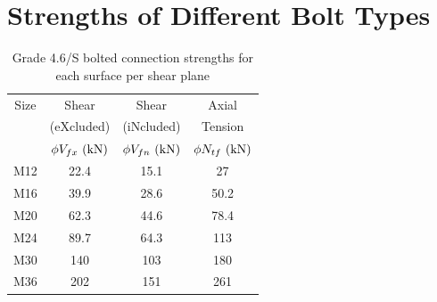 \section{Strengths of Different Bolt Types}
\begin{table}[H]
\centering\footnotesize
\caption{Grade 4.6/S bolted connection strengths for each surface per shear plane}
\begin{tabular}{c|ccc}
	\toprule
	Size &           Shear           &           Shear           &          Axial           \\
	     &        (eXcluded)         &        (iNcluded)         &         Tension          \\
	     & $\phi{}V_{fx}~(\si{\kilo\newton})$ & $\phi{}V_{fn}~(\si{\kilo\newton})$ & $\phi{}N_{tf}~(\si{\kilo\newton})$ \\ \midrule
	M12  &           22.4            &           15.1            &            27            \\
	M16  &           39.9            &           28.6            &           50.2           \\
	M20  &           62.3            &           44.6            &           78.4           \\
	M24  &           89.7            &           64.3            &           113            \\
	M30  &            140            &            103            &           180            \\
	M36  &            202            &            151            &           261            \\ \bottomrule
\end{tabular}
\end{table}
